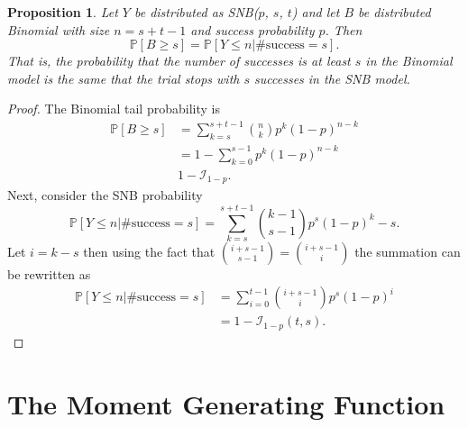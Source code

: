 \documentclass[review]{elsarticle}
\newtheorem{prop}{Proposition}
\begin{document}
\begin{prop} Let $Y$ be distributed as SNB($p$, $s$, $t$) and let 
$B$ be distributed Binomial with size $n=s+t-1$ and success probability
$p$. Then
\begin{equation}
\mathbb{P}[B \geq s] = \mathbb{P} [Y \leq n | \text{\#success} = s].
\end{equation}
That is, the probability that the number of successes is at least $s$
in the Binomial model is the same that the trial stops with $s$ 
successes in the SNB model.
\end{prop}
\begin{proof}
The Binomial tail probability is
\begin{align*}
\mathbb{P}[B \geq s] &= \sum_{k=s}^{s+t-1} {n \choose k} p^k (1-p)^{n-k} \\
  &= 1 - \sum_{k=0}^{s-1} p^k (1-p)^{n-k} \\
  & 1 - \mathcal{I}_{1-p}.
\end{align*}
Next, consider the SNB probability
\begin{equation*}
\mathbb{P} [Y \leq n | \text{\#success} = s] = \sum_{k=s}^{s+t-1}
  {k-1 \choose s-1} p^s (1-p)^k-s.
\end{equation*}
Let $i=k-s$ then using the fact that ${i+s-1 \choose s-1} = {i+s-1 \choose i}$
the summation can be rewritten as
\begin{align}
\mathbb{P} [Y \leq n | \text{\#success} = s] &= \sum_{i=0}^{t-1} 
  {i+s-1 \choose i} p^s (1-p)^i\\
  &= 1 - \mathcal{I}_{1-p}(t, s).
\end{align}
\end{proof}

\section{The Moment Generating Function}
\end{document}

